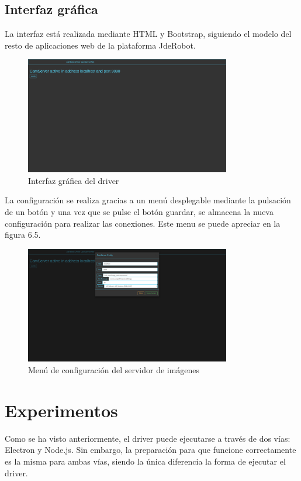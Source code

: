 \subsection{Interfaz gráfica}
La interfaz está realizada mediante HTML y Bootstrap, siguiendo el modelo del resto de aplicaciones web de la plataforma JdeRobot.
\begin{figure}[H]
  \begin{center}
    \includegraphics[width=0.8\textwidth]{figures/Interfazcamserver.png}
		\caption{Interfaz gráfica del driver}
		\label{fig.interfazcamserver}
		\end{center}
\end{figure}
La configuración se realiza gracias a un menú desplegable mediante la pulsación de un botón y una vez que se pulse el botón guardar, se almacena la nueva configuración para realizar las conexiones. Este menu se puede apreciar en la figura 6.5.
 \begin{figure}[H]
  \begin{center}
    \includegraphics[width=0.8\textwidth]{figures/configcamserver.png}
		\caption{Menú de configuración del servidor de imágenes}
		\label{fig.configcamserver}
		\end{center}
\end{figure}

\section{Experimentos}
Como se ha visto anteriormente, el driver puede ejecutarse a través de dos vías: Electron y Node.js. Sin embargo, la preparación para que funcione correctamente es la misma para ambas vías, siendo la única diferencia la forma de ejecutar el driver.

